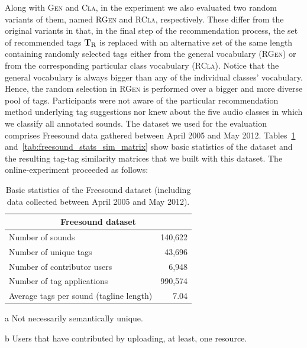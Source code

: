 Along with \textsc{Gen} and \textsc{Cla}, in the experiment we also evaluated two random variants of them, named \textsc{RGen} and \textsc{RCla}, respectively. These differ from the original variants in that, in the final step of the recommendation process, the set of recommended tags $\mathbf{T}_{\text{R}}$ is replaced with an alternative set of the same length containing randomly selected tags either from the general vocabulary (\textsc{RGen}) or from the corresponding particular class vocabulary (\textsc{RCla}). Notice that the general vocabulary is always bigger than any of the individual classes' vocabulary. Hence, the random selection in \textsc{RGen} is performed over a bigger and more diverse pool of tags. Participants were not aware of the particular recommendation method underlying tag suggestions nor knew about the five audio classes in which we classify all annotated sounds. The dataset we used for the evaluation comprises Freesound data gathered between April 2005 and May 2012. %
Tables~\ref{tab:freesound_stats} and~\ref{tab:freesound_stats_sim_matrix} show basic statistics of the dataset and the resulting tag-tag similarity matrices that we built with this dataset.
The online-experiment proceeded as follows:

\begin{table}
\begin{center}
\begin{threeparttable}
\footnotesize
\begin{tabular}{p{8cm}r}
\toprule
\multicolumn{2}{c}{\textbf{Freesound dataset}} \\
\midrule
Number of sounds & 140,622  \\ 
Number of unique tags\tnote{a}  & 43,696  \\ 
Number of contributor users\tnote{b}  & 6,948  \\ 
Number of tag applications & 990,574  \\ 
Average tags per sound (tagline length) & 7.04  \\
\bottomrule
\end{tabular}
\begin{tablenotes}
    \item[a] Not necessarily semantically unique.
    \item[b] Users that have contributed by uploading, at least, one resource.
    \end{tablenotes}
  \caption[Basic statistics of the Freesound dataset]{Basic statistics of the Freesound dataset (including data collected between April 2005 and May 2012).}
\label{tab:freesound_stats}
\end{threeparttable}
\end{center}
\end{table}

